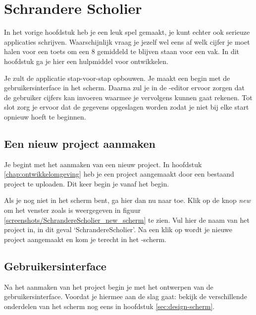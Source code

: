 \chapter{Schrandere Scholier}

In het vorige hoofdstuk heb je een leuk spel gemaakt, je kunt echter ook serieuze applicaties schrijven. Waarschijnlijk vraag je jezelf wel eens af welk cijfer je moet halen voor een toets om een 8 gemiddeld te blijven staan voor een vak. In dit hoofdstuk ga je hier een hulpmiddel voor ontwikkelen.

Je zult de applicatie stap-voor-stap opbouwen. Je maakt een begin met de gebruikersinterface in het  scherm. Daarna zul je in de -editor ervoor zorgen dat de gebruiker cijfers kan invoeren waarmee je vervolgens kunnen gaat rekenen. Tot slot zorg je ervoor dat de gegevens opgeslagen worden zodat je niet bij elke start opnieuw hoeft te beginnen.

\section{Een nieuw project aanmaken}
Je begint met het aanmaken van een nieuw project. In hoofdstuk \ref{chap:ontwikkelomgeving} heb je een project aangemaakt door een bestaand project te uploaden. Dit keer begin je vanaf het begin. 

Als je nog niet in het  scherm bent, ga hier dan nu naar toe. Klik op de knop \emph{new} om het venster zoals is weergegeven in figuur \ref{screenshots/SchrandereScholier_new_scherm} te zien. Vul hier de naam van het project in, in dit geval `SchrandereScholier'. Na een klik op  wordt je nieuwe project aangemaakt en kom je terecht in het -scherm.

\section{Gebruikersinterface}
Na het aanmaken van het project begin je met het ontwerpen van de gebruikersinterface. Voordat je hiermee aan de slag gaat: bekijk de verschillende onderdelen van het scherm nog eens in hoofdstuk \ref{sec:design-scherm}.

